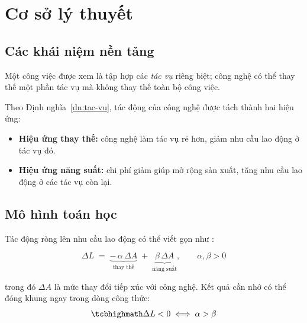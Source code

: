 \chapter{Cơ sở lý thuyết}
\label{chap:co-so}

\section{Các khái niệm nền tảng}
\label{sec:khai-niem}

\begin{dinhnghia}
  \label{dn:tac-vu}
  Một công việc được xem là tập hợp các \textit{tác vụ} riêng biệt; công nghệ có thể
  thay thế một phần tác vụ mà không thay thế toàn bộ công việc.
\end{dinhnghia}

Theo Định nghĩa~\ref{dn:tac-vu}, tác động của công nghệ được tách thành hai hiệu ứng:
\begin{itemize}
  \item \textbf{Hiệu ứng thay thế:} công nghệ làm tác vụ rẻ hơn, giảm nhu cầu lao động
        ở tác vụ đó.
  \item \textbf{Hiệu ứng năng suất:} chi phí giảm giúp mở rộng sản xuất, tăng nhu cầu
        lao động ở các tác vụ còn lại.
\end{itemize}

\section{Mô hình toán học}
\label{sec:mo-hinh}

Tác động ròng lên nhu cầu lao động có thể viết gọn như :
\begin{khungcongthuc}
  \begin{equation}
    \label{eq:tac-dong}
    \Delta L \;=\; \underbrace{-\,\alpha \, \Delta A}_{\text{thay thế}}
          \;+\; \underbrace{\beta \, \Delta A}_{\text{năng suất}},
    \qquad \alpha, \beta > 0
  \end{equation}
\end{khungcongthuc}
trong đó $\Delta A$ là mức thay đổi tiếp xúc với công nghệ. Kết quả cần nhớ có thể
đóng khung ngay trong dòng công thức:
\begin{equation}
  \label{eq:dieu-kien}
  \NoiBat{\Delta L < 0 \iff \alpha > \beta}
\end{equation}

